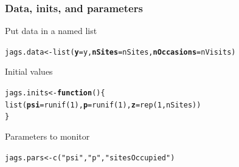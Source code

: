 \documentclass[color=usenames,dvipsnames]{beamer}\usepackage[]{graphicx}\usepackage[]{xcolor}
\makeatletter
\newcommand{\hlnum}[1]{\textcolor[rgb]{0.69,0.494,0}{#1}}%
\newcommand{\hlsng}[1]{\textcolor[rgb]{0.749,0.012,0.012}{#1}}%
\newcommand{\hldef}[1]{\textcolor[rgb]{0,0,0}{#1}}%
\newcommand{\hlkwa}[1]{\textcolor[rgb]{0,0,0}{\textbf{#1}}}%
\newcommand{\hlkwb}[1]{\textcolor[rgb]{0,0.341,0.682}{#1}}%
\newcommand{\hlkwc}[1]{\textcolor[rgb]{0,0,0}{\textbf{#1}}}%
\newcommand{\hlkwd}[1]{\textcolor[rgb]{0.004,0.004,0.506}{#1}}%
\newenvironment{kframe}{%
 \def\at@end@of@kframe{}%
 \ifinner\ifhmode%
  \def\at@end@of@kframe{\end{minipage}}%
  \begin{minipage}{\columnwidth}%
 \fi\fi%
 \def\FrameCommand##1{\hskip\@totalleftmargin \hskip-\fboxsep
 \colorbox{shadecolor}{##1}\hskip-\fboxsep
     \hskip-\linewidth \hskip-\@totalleftmargin \hskip\columnwidth}%
 \MakeFramed {\advance\hsize-\width
   \@totalleftmargin\z@ \linewidth\hsize
   \@setminipage}}%
 {\par\unskip\endMakeFramed%
 \at@end@of@kframe}
\newenvironment{knitrout}{}{} %
\makeatother
\begin{document}
\begin{frame}[fragile]
  \frametitle{Data, inits, and parameters}
  Put data in a named list
  \vspace{-12pt}
\begin{knitrout}\small
{}\color{fgcolor}\begin{kframe}
\begin{alltt}
\hldef{jags.data} \hlkwb{<-} \hlkwd{list}\hldef{(}\hlkwc{y}\hldef{=y,} \hlkwc{nSites}\hldef{=nSites,} \hlkwc{nOccasions}\hldef{=nVisits)}
\end{alltt}
\end{kframe}
\end{knitrout}
\pause
\vfill
  Initial values
  \vspace{-12pt}
\begin{knitrout}\small
{}\color{fgcolor}\begin{kframe}
\begin{alltt}
\hldef{jags.inits} \hlkwb{<-} \hlkwa{function}\hldef{() \{}
    \hlkwd{list}\hldef{(}\hlkwc{psi}\hldef{=}\hlkwd{runif}\hldef{(}\hlnum{1}\hldef{),} \hlkwc{p}\hldef{=}\hlkwd{runif}\hldef{(}\hlnum{1}\hldef{),} \hlkwc{z}\hldef{=}\hlkwd{rep}\hldef{(}\hlnum{1}\hldef{, nSites))}
\hldef{\}}
\end{alltt}
\end{kframe}
\end{knitrout}
\pause
\vfill
  Parameters to monitor
  \vspace{-12pt}
\begin{knitrout}\small
{}\color{fgcolor}\begin{kframe}
\begin{alltt}
\hldef{jags.pars} \hlkwb{<-} \hlkwd{c}\hldef{(}\hlsng{"psi"}\hldef{,} \hlsng{"p"}\hldef{,} \hlsng{"sitesOccupied"}\hldef{)}
\end{alltt}
\end{kframe}
\end{knitrout}
\end{frame}
\end{document}
